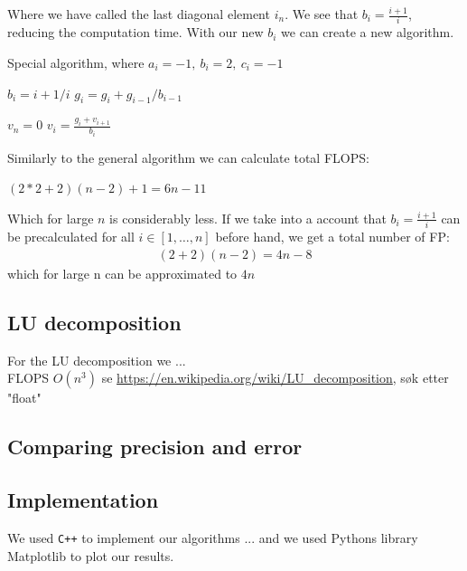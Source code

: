 \documentclass[american,a4paper,12pt]{article}
\begin{document}
Where we have called the last diagonal element $i_n$. We see that $b_i = \frac{i+1}{i}$, reducing the computation time. With our new $b_i$ we can create a new algorithm.
\begin{algorithm}
\caption{Special algorithm, where $a_i = -1,\ b_i = 2,\ c_i = -1$}
\begin{algorithmic}[1]
   
    \State $b_i = {i+1}/i$ 
    \State $g_i = g_i + {g}_{i-1}/{{b}_{i-1}}$ 
  \EndFor

  \Statex
  \State $v_n = 0$ 
    \State $v_i = \frac{g_i + v_{i+1}}{b_i}$
  \EndFor
\end{algorithmic}
\end{algorithm}

Similarly to the general algorithm we can calculate total FLOPS:
\begin{center}
    $(2*2+2)(n-2)+1 = 6n-11$
\end{center}
Which for large $n$ is considerably less. If we take into a account that $b_i = \frac{i+1}{i}$ can be precalculated for all $i \in [1, \hdots, n]$ before hand, we get a total number of FP:
\begin{align*}
  (2 + 2)(n-2) = 4n - 8
\end{align*}
which for large n can be approximated to $4n$
\subsection{LU decomposition}
For the LU decomposition we ...\\
FLOPS $O(n^3)$ se \url{https://en.wikipedia.org/wiki/LU_decomposition}, søk etter "float"

\subsection{Comparing precision and error}


\subsection{Implementation}
We used \verb!C++! to implement our algorithms ... and we used Pythons library Matplotlib to plot our results.
\end{document}
